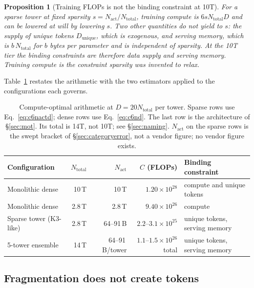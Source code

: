 \documentclass[11pt]{article}
\newtheorem{proposition}{Proposition}
\begin{document}
\begin{proposition}[Training FLOPs is not the binding constraint at 10T]
\label{prop:binding}
For a sparse tower at fixed sparsity $s = N_{\mathrm{act}}/N_{\mathrm{total}}$, training compute is $6 s N_{\mathrm{total}} D$ and can be lowered at will by lowering $s$. Two other quantities do not yield to $s$: the supply of unique tokens $D_{\mathrm{unique}}$, which is exogenous, and serving memory, which is $b\,N_{\mathrm{total}}$ for $b$ bytes per parameter and is independent of sparsity. At the 10T tier the binding constraints are therefore data supply and serving memory. Training compute is the constraint sparsity was invented to relax.
\end{proposition}

Table~\ref{tab:scaling} restates the arithmetic with the two estimators applied to the configurations each governs.

\begin{table}[h]
\centering
\small
\setlength{\tabcolsep}{4pt}
\begin{tabular}{@{}lrrrl@{}}
\toprule
\textbf{Configuration} & \textbf{$N_{\text{total}}$} & \textbf{$N_{\text{act}}$} & \textbf{$C$ (FLOPs)} & \textbf{Binding constraint} \\
\midrule
Monolithic dense & 10\,T & 10\,T & $1.20\times10^{28}$ & compute and unique tokens \\
Monolithic dense & 2.8\,T & 2.8\,T & $9.40\times10^{26}$ & compute \\
Sparse tower (K3-like) & 2.8\,T & 64--91\,B & $2.2$--$3.1\times10^{25}$ & unique tokens, serving memory \\
5-tower ensemble & 14\,T & 64--91\,B/tower & $1.1$--$1.5\times10^{26}$ total & unique tokens, serving memory \\
\bottomrule
\end{tabular}
\caption{Compute-optimal arithmetic at $D=20N_{\text{total}}$ per tower. Sparse rows use Eq.~\eqref{eq:c6nactd}; dense rows use Eq.~\eqref{eq:c6nd}. The last row is the architecture of \S\ref{sec:mot}. Its total is 14T, not 10T; see \S\ref{sec:naming}. $N_{\text{act}}$ on the sparse rows is the swept bracket of \S\ref{sec:categoryerror}, not a vendor figure; no vendor figure exists.}
\label{tab:scaling}
\end{table}

\subsection{Fragmentation does not create tokens}
\label{sec:fragmentation}
\end{document}
